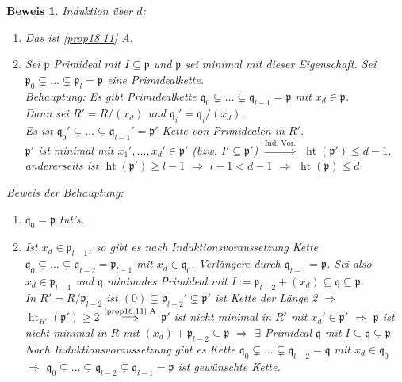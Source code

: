 \documentclass[a4paper,12pt]{report}
\theoremstyle{break}
\theoremstyle{nonumberbreak}
\newtheorem{Bew}{Beweis}
\theoremstyle{nonumberplain}
\DeclareMathOperator{\Ht}{ht}
\newcommand{\frakp}{\mathfrak{p}}
\newcommand{\frakq}{\mathfrak{q}}
\begin{document}
\begin{Bew}
Induktion \"uber $d$:\begin{enumerate}[$d=10$]
\item[\underline{$d=1$:}]
	Das ist \ref{prop18.11} A.
\item[\underline{$d\ge2$:}]
	Sei $\frakp$ Primideal mit $I\subseteq \frakp$ und $\frakp$ sei minimal mit dieser Eigenschaft. Sei $\frakp_0\subsetneq\ldots \subsetneq \frakp_l= \frakp$ eine Primidealkette.\\
	\emph{Behauptung:} Es gibt Primidealkette $\frakq_0\subsetneq\ldots \subsetneq\frakq_{l-1}=\frakp$ mit $x_d\in\frakp$.\\
	Dann sei $R'=R/(x_d)$ und $\frakq_i'=\frakq_i/(x_d)$.\\
	Es ist $\frakq_0'\subsetneq\ldots \subsetneq\frakq_{l-1}'=\frakp'$ Kette von Primidealen in $R'$.\\
	$\frakp'$ ist minimal mit $x_1',\ldots ,x_d'\in \frakp'$ (bzw. $I'\subseteq\frakp'$) $\overset{\text{Ind. Vor.}}{\Longrightarrow}$ $\Ht(\frakp')\le d-1$, andererseits ist $\Ht(\frakp')\ge l-1$ $\Rightarrow $ $l-1<d-1$ $\Rightarrow $ $\Ht(\frakp)\le d$
\end{enumerate}
\emph{Beweis der Behauptung:}\begin{enumerate}[$l=10$]
\item[\underline{$l=1$:}]
	$\frakq_0=\frakp$ tut's.
\item[\underline{$l\ge2$:}]
	Ist $x_d\in \frakp_{l-1}$, so gibt es nach Induktionsvoraussetzung Kette $\frakq_0\subsetneq\ldots \subsetneq\frakq_{l-2}=\frakp_{l-1}$ mit $x_d\in \frakq_0$. Verl\"angere durch $\frakq_{l-1}=\frakp$. Sei also $x_d\in \frakp_{l-1}$ und $\frakq$ minimales Primideal mit $I:=\frakp_{l-2}+(x_d)\subseteq\frakq\subseteq\frakp$.\\
	In $R'=R/\frakp_{l-2}$ ist $(0)\subsetneq\frakp_{l-2}'\subsetneq\frakp'$ ist Kette der L\"ange 2 $\Rightarrow$ $\Ht_{R'}(\frakp')\ge2$ $\overset{\text{\ref{prop18.11} A}}{\Longrightarrow}$ $\frakp'$ ist \emph{nicht} minimal in $R'$ mit $x_d'\in\frakp'$ $\Rightarrow $ $\frakp$ ist nicht minimal in $R$ mit $(x_d)+\frakp_{l-2}\subseteq\frakp$ $\Rightarrow $ $\exists$ Primideal $\frakq$ mit $I\subseteq\frakq\subsetneq\frakp$\\
	Nach Induktionsvoraussetzung gibt es Kette $\frakq_0\subsetneq\ldots \subsetneq\frakq_{l-2}=\frakq$ mit $x_d\in\frakq_0$ $\Rightarrow $ $\frakq_0\subsetneq\ldots \subsetneq\frakq_{l-2}\subsetneq\frakq_{l-1}=\frakp$ ist gew\"unschte Kette.
\end{enumerate}\end{Bew}
\end{document}

